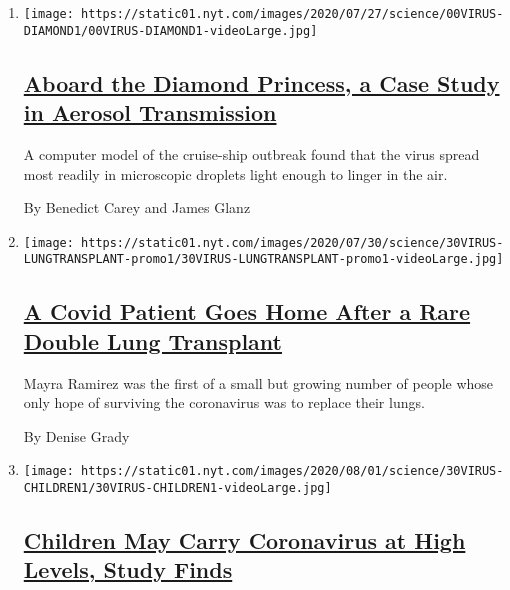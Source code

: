\begin{enumerate}
\def\labelenumi{\arabic{enumi}.}
\item
  \texttt{[image: https://static01.nyt.com/images/2020/07/27/science/00VIRUS-DIAMOND1/00VIRUS-DIAMOND1-videoLarge.jpg]}

  \hypertarget{aboard-the-diamond-princess-a-case-study-in-aerosol-transmission}{%
  \subsection{\texorpdfstring{\href{/2020/07/30/health/diamond-princess-coronavirus-aerosol.html}{Aboard
  the Diamond Princess, a Case Study in Aerosol
  Transmission}}{Aboard the Diamond Princess, a Case Study in Aerosol Transmission}}\label{aboard-the-diamond-princess-a-case-study-in-aerosol-transmission}}

  A computer model of the cruise-ship outbreak found that the virus
  spread most readily in microscopic droplets light enough to linger in
  the air.

  By Benedict Carey and James Glanz
\item
  \texttt{[image: https://static01.nyt.com/images/2020/07/30/science/30VIRUS-LUNGTRANSPLANT-promo1/30VIRUS-LUNGTRANSPLANT-promo1-videoLarge.jpg]}

  \hypertarget{a-covid-patient-goes-home-after-a-rare-double-lung-transplant}{%
  \subsection{\texorpdfstring{\href{/2020/07/30/health/Covid-lung-transplant.html}{A
  Covid Patient Goes Home After a Rare Double Lung
  Transplant}}{A Covid Patient Goes Home After a Rare Double Lung Transplant}}\label{a-covid-patient-goes-home-after-a-rare-double-lung-transplant}}

  Mayra Ramirez was the first of a small but growing number of people
  whose only hope of surviving the coronavirus was to replace their
  lungs.

  By Denise Grady
\item
  \texttt{[image: https://static01.nyt.com/images/2020/08/01/science/30VIRUS-CHILDREN1/30VIRUS-CHILDREN1-videoLarge.jpg]}

  \hypertarget{children-may-carry-coronavirus-at-high-levels-study-finds}{%
  \subsection{\texorpdfstring{\href{/2020/07/30/health/coronavirus-children.html}{Children
  May Carry Coronavirus at High Levels, Study
  Finds}}{Children May Carry Coronavirus at High Levels, Study Finds}}\label{children-may-carry-coronavirus-at-high-levels-study-finds}}


\end{enumerate}
